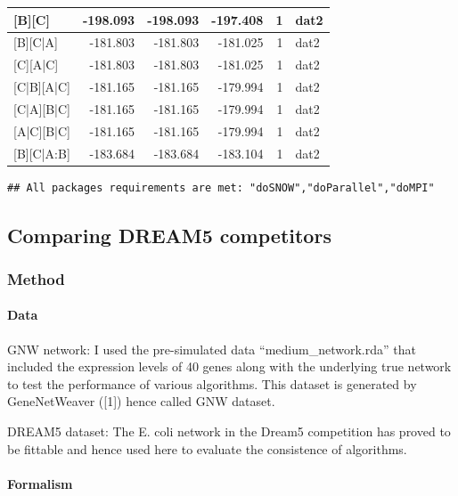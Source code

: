 \documentclass[]{article}
\let\oldparagraph\paragraph
\renewcommand{\paragraph}[1]{\oldparagraph{#1}\mbox{}}
\theoremstyle{definition}
\theoremstyle{definition}
\theoremstyle{definition}
\theoremstyle{remark}
\begin{document}
\begin{table}
\begin{tabular}[t]{l|r|r|r|r|l}
\hline
[A][B][C] & -198.093 & -198.093 & -197.408 & 1 & dat2\\
\hline
[A][B][C|A] & -181.803 & -181.803 & -181.025 & 1 & dat2\\
\hline
[B][C][A|C] & -181.803 & -181.803 & -181.025 & 1 & dat2\\
\hline
[B][C|B][A|C] & -181.165 & -181.165 & -179.994 & 1 & dat2\\
\hline
[A][C|A][B|C] & -181.165 & -181.165 & -179.994 & 1 & dat2\\
\hline
[C][A|C][B|C] & -181.165 & -181.165 & -179.994 & 1 & dat2\\
\hline
[A][B][C|A:B] & -183.684 & -183.684 & -183.104 & 1 & dat2\\
\hline
\end{tabular}
\end{table}

\begin{verbatim}
## All packages requirements are met: "doSNOW","doParallel","doMPI"
\end{verbatim}

\subsection{Comparing DREAM5
competitors}\label{comparing-dream5-competitors}

\subsubsection{Method}\label{method}

\paragraph{Data}\label{data}

GNW network: I used the pre-simulated data ``medium\_network.rda'' that
included the expression levels of 40 genes along with the underlying
true network to test the performance of various algorithms. This dataset
is generated by GeneNetWeaver ({[}1{]}) hence called GNW dataset.

DREAM5 dataset: The E. coli network in the Dream5 competition has proved
to be fittable and hence used here to evaluate the consistence of
algorithms.

\paragraph{Formalism}\label{formalism}
\end{document}
